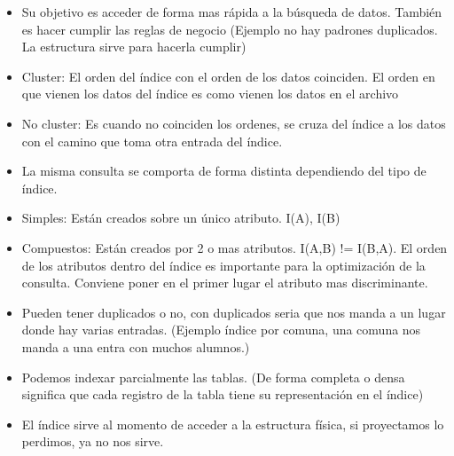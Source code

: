 \begin{itemize}
\item Su objetivo es acceder de forma mas rápida a la búsqueda de datos. También es hacer cumplir las reglas de negocio (Ejemplo no hay padrones duplicados. La estructura sirve para hacerla cumplir)
\item Cluster: El orden del índice con el orden de los datos coinciden. El orden en que vienen los datos del índice es como vienen los datos en el archivo
\item No cluster: Es cuando no coinciden los ordenes, se cruza del índice a los datos con el camino que toma otra entrada del índice.
\item La misma consulta se comporta de forma distinta dependiendo del tipo de índice.
\item Simples: Están creados sobre un único atributo. I(A), I(B)
\item Compuestos: Están creados por 2 o mas atributos. I(A,B) != I(B,A). El orden de los atributos dentro del índice es importante para la optimización de la consulta. Conviene poner en el primer lugar el atributo mas discriminante.
\item Pueden tener duplicados o no, con duplicados seria que nos manda a un lugar donde hay varias entradas. (Ejemplo índice por comuna, una comuna nos manda a una entra con muchos alumnos.)
\item Podemos indexar parcialmente las tablas. (De forma completa o densa significa que cada registro de la tabla tiene su representación en el índice)
\item El índice sirve al momento de acceder a la estructura física, si proyectamos lo perdimos, ya no nos sirve.
\end{itemize}









\newpage